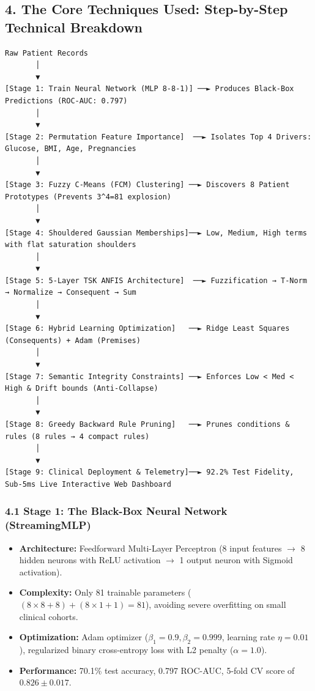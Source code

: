 \subsection{4. The Core Techniques Used: Step-by-Step Technical
Breakdown}\label{the-core-techniques-used-step-by-step-technical-breakdown}

\begin{verbatim}
Raw Patient Records
       │
       ▼
[Stage 1: Train Neural Network (MLP 8-8-1)] ──► Produces Black-Box Predictions (ROC-AUC: 0.797)
       │
       ▼
[Stage 2: Permutation Feature Importance]  ──► Isolates Top 4 Drivers: Glucose, BMI, Age, Pregnancies
       │
       ▼
[Stage 3: Fuzzy C-Means (FCM) Clustering] ──► Discovers 8 Patient Prototypes (Prevents 3^4=81 explosion)
       │
       ▼
[Stage 4: Shouldered Gaussian Memberships]──► Low, Medium, High terms with flat saturation shoulders
       │
       ▼
[Stage 5: 5-Layer TSK ANFIS Architecture]  ──► Fuzzification → T-Norm → Normalize → Consequent → Sum
       │
       ▼
[Stage 6: Hybrid Learning Optimization]   ──► Ridge Least Squares (Consequents) + Adam (Premises)
       │
       ▼
[Stage 7: Semantic Integrity Constraints] ──► Enforces Low < Med < High & Drift bounds (Anti-Collapse)
       │
       ▼
[Stage 8: Greedy Backward Rule Pruning]   ──► Prunes conditions & rules (8 rules → 4 compact rules)
       │
       ▼
[Stage 9: Clinical Deployment & Telemetry]──► 92.2% Test Fidelity, Sub-5ms Live Interactive Web Dashboard
\end{verbatim}

\subsubsection{4.1 Stage 1: The Black-Box Neural Network
(StreamingMLP)}\label{stage-1-the-black-box-neural-network-streamingmlp}

\begin{itemize}
\tightlist
\item
  \textbf{Architecture:} Feedforward Multi-Layer Perceptron (8 input
  features \(\to\) 8 hidden neurons with ReLU activation \(\to\) 1
  output neuron with Sigmoid activation).
\item
  \textbf{Complexity:} Only 81 trainable parameters
  (\((8 \times 8 + 8) + (8 \times 1 + 1) = 81\)), avoiding severe
  overfitting on small clinical cohorts.
\item
  \textbf{Optimization:} Adam optimizer (\(\beta_1=0.9, \beta_2=0.999\),
  learning rate \(\eta=0.01\)), regularized binary cross-entropy loss
  with L2 penalty (\(\alpha=1.0\)).
\item
  \textbf{Performance:} 70.1\% test accuracy, 0.797 ROC-AUC, 5-fold CV
  score of \(0.826 \pm 0.017\).
\end{itemize}

